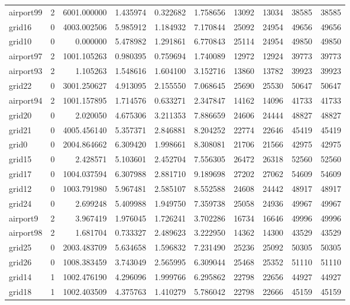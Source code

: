 \begin{longtable}{|l|r|r|r|r|r|r|r|r|r|}
airport99 & 2 & 6001.000000 & 1.435974 & 0.322682 & 1.758656 & 13092 & 13034 & 38585 & 38585 \\
grid16 & 0 & 4003.002506 & 5.985912 & 1.184932 & 7.170844 & 25092 & 24954 & 49656 & 49656 \\
grid10 & 0 & 0.000000 & 5.478982 & 1.291861 & 6.770843 & 25114 & 24954 & 49850 & 49850 \\
airport97 & 2 & 1001.105263 & 0.980395 & 0.759694 & 1.740089 & 12972 & 12924 & 39773 & 39773 \\
airport93 & 2 & 1.105263 & 1.548616 & 1.604100 & 3.152716 & 13860 & 13782 & 39923 & 39923 \\
grid22 & 0 & 3001.250627 & 4.913095 & 2.155550 & 7.068645 & 25690 & 25530 & 50647 & 50647 \\
airport94 & 2 & 1001.157895 & 1.714576 & 0.633271 & 2.347847 & 14162 & 14096 & 41733 & 41733 \\
grid20 & 0 & 2.020050 & 4.675306 & 3.211353 & 7.886659 & 24606 & 24444 & 48827 & 48827 \\
grid21 & 0 & 4005.456140 & 5.357371 & 2.846881 & 8.204252 & 22774 & 22646 & 45419 & 45419 \\
grid0 & 0 & 2004.864662 & 6.309420 & 1.998661 & 8.308081 & 21706 & 21566 & 42975 & 42975 \\
grid15 & 0 & 2.428571 & 5.103601 & 2.452704 & 7.556305 & 26472 & 26318 & 52560 & 52560 \\
grid17 & 0 & 1004.037594 & 6.307988 & 2.881710 & 9.189698 & 27202 & 27062 & 54609 & 54609 \\
grid12 & 0 & 1003.791980 & 5.967481 & 2.585107 & 8.552588 & 24608 & 24442 & 48917 & 48917 \\
grid24 & 0 & 2.699248 & 5.409988 & 1.949750 & 7.359738 & 25058 & 24936 & 49967 & 49967 \\
airport9 & 2 & 3.967419 & 1.976045 & 1.726241 & 3.702286 & 16734 & 16646 & 49996 & 49996 \\
airport98 & 2 & 1.681704 & 0.733327 & 2.489623 & 3.222950 & 14362 & 14300 & 43529 & 43529 \\
grid25 & 0 & 2003.483709 & 5.634658 & 1.596832 & 7.231490 & 25236 & 25092 & 50305 & 50305 \\
grid26 & 0 & 1008.383459 & 3.743049 & 2.565995 & 6.309044 & 25468 & 25352 & 51110 & 51110 \\
grid14 & 1 & 1002.476190 & 4.296096 & 1.999766 & 6.295862 & 22798 & 22656 & 44927 & 44927 \\
grid18 & 1 & 1002.403509 & 4.375763 & 1.410279 & 5.786042 & 22798 & 22666 & 45159 & 45159 \\

\end{longtable}
